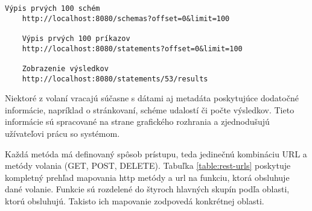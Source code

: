 	\begin{lstlisting}[label=lst:rest-api,caption=Príklad volaní REST API]
	Výpis prvých 100 schém
	http://localhost:8080/schemas?offset=0&limit=100
	
	Výpis prvých 100 príkazov
	http://localhost:8080/statements?offset=0&limit=100
	
	Zobrazenie výsledkov
	http://localhost:8080/statements/53/results
	\end{lstlisting}
	
	Niektoré z volaní vracajú súčasne s dátami aj metadáta poskytujúce dodatočné informácie, napríklad o stránkovaní, schéme udalostí či počte výsledkov. Tieto informácie sú spracované na strane grafického rozhrania a zjednodušujú užívateľovi prácu so systémom.
	
	Každá metóda má definovaný spôsob prístupu, teda jedinečnú kombináciu URL a metódy volania (GET, POST, DELETE). Tabuľka \ref{table:rest-urls} poskytuje kompletný prehľad mapovania http metódy a url na funkciu, ktorá obsluhuje dané volanie.	Funkcie sú rozdelené do štyroch hlavných skupín podľa oblasti, ktorú obsluhujú. Takisto ich mapovanie zodpovedá konkrétnej oblasti.
	
